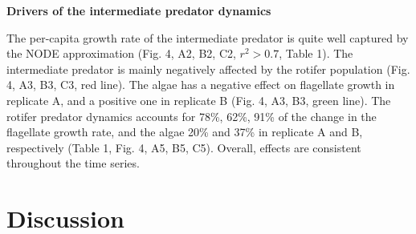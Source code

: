 \documentclass[11pt, oneside]{article}
\begin{document}
\textbf{Drivers of the intermediate predator dynamics}

The per-capita growth rate of the intermediate predator is quite well captured by the NODE approximation (Fig. 4, A2, B2, C2, $r^2 > 0.7$, Table 1).
The intermediate predator is mainly negatively affected by the rotifer population (Fig. 4, A3, B3, C3, red line).
The algae has a negative effect on flagellate growth in replicate A, and a positive one in replicate B (Fig. 4, A3, B3, green line).
The rotifer predator dynamics accounts for 78\%, 62\%, 91\% of the change in the flagellate growth rate, and the algae 20\% and 37\% in replicate A and B, respectively (Table 1, Fig. 4, A5, B5, C5).
Overall, effects are consistent throughout the time series.

\section{Discussion}
\end{document}
